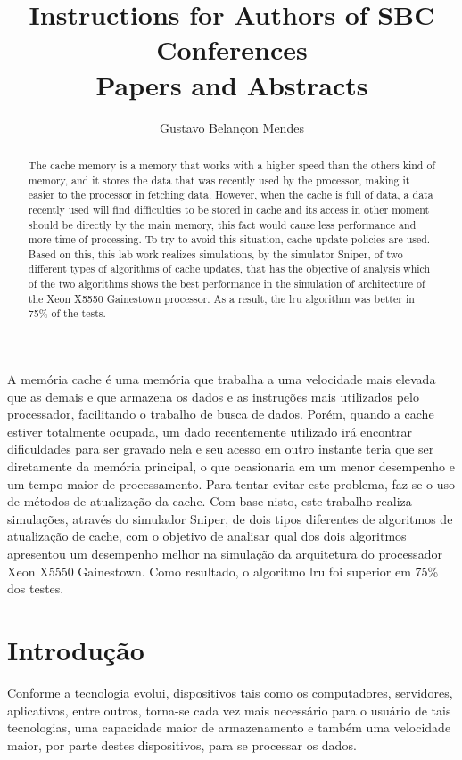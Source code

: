 \documentclass[12pt]{article}
\title{Instructions for Authors of SBC Conferences\\ Papers and Abstracts}
\author{Gustavo Belançon Mendes\inst{1}}
\begin{document}
 

\maketitle

\begin{resumo}
  A memória cache é uma memória que trabalha a uma velocidade mais elevada que as demais e que armazena os dados e as instruções mais utilizados pelo processador, facilitando o trabalho de busca de dados. Porém, quando a cache estiver totalmente ocupada, um dado recentemente utilizado irá encontrar dificuldades para ser gravado nela e seu acesso em outro instante teria que ser diretamente da memória principal, o que ocasionaria em um menor desempenho e um tempo maior de processamento. Para tentar evitar este problema, faz-se o uso de métodos de atualização da cache. Com base nisto, este trabalho realiza simulações, através do simulador Sniper, de dois tipos diferentes de algoritmos de atualização de cache, com o objetivo de analisar qual dos dois algoritmos apresentou um desempenho melhor na simulação da arquitetura do processador Xeon X5550 Gainestown. Como resultado, o algoritmo lru foi superior em 75\% dos testes.
\end{resumo}
     
\begin{abstract} 
  The cache memory is a memory that works with a higher speed than the others kind of memory, and it stores the data that was recently used by the processor, making it easier to the processor in fetching data. However, when the cache is full of data, a data recently used will find difficulties to be stored in cache and its access in other moment should be directly by the main memory, this fact would cause less performance and more time of processing. To try to avoid this situation, cache update policies are used. Based on this, this lab work realizes simulations, by the simulator Sniper, of two different types of algorithms of cache updates, that has the objective of analysis which of the two algorithms shows the best performance in the simulation of architecture of the Xeon X5550 Gainestown processor. As a result, the lru algorithm was better in 75\% of the tests.
\end{abstract}


\section{Introdução}

Conforme a tecnologia evolui, dispositivos tais como os computadores, servidores, aplicativos, entre outros, torna-se cada vez mais necessário para o usuário de tais tecnologias, uma capacidade maior de armazenamento e também uma velocidade maior, por parte destes dispositivos, para se processar os dados. 
\end{document}
